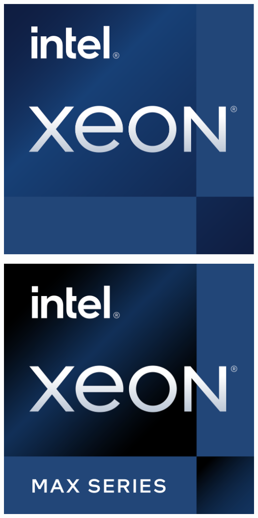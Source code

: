 \documentclass[a4paper]{article}
\begin{document}
    \noindent
    \begin{minipage}{.18\textwidth}
        \includegraphics[width=\textwidth]{img/xeon_logo.png}
    \end{minipage}
    \begin{minipage}{.18\textwidth}
        \includegraphics[width=\textwidth]{img/xeon_max_series_logo.png}
    \end{minipage}
\end{document}
